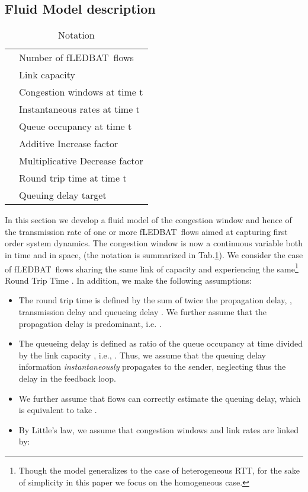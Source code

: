 \documentclass[conference]{IEEEtran}
\newcommand{\fledbat}[0]{fLEDBAT}
\begin{document}
\subsection{Fluid Model description}\label{sec:fluidmodel}
\begin{table}[!t]
   \begin{footnotesize}
   \begin{center}
      \caption{Notation}\label{tab:notation}
      \begin{tabular}{|l|l|}
         \hline
                                & Number of \fledbat\ flows \\
                                & Link capacity \\
           & Congestion windows at time t \\
           & Instantaneous rates at time t \\
                              & Queue occupancy at time t \\
                           & Additive Increase factor \\
                            & Multiplicative Decrease factor \\
                              & Round trip time at time t \\
                             & Queuing delay target \\
         \hline
      \end{tabular}
   \end{center}
   \end{footnotesize}
\end{table}
In this section we develop a fluid model of the congestion window and hence of the transmission rate of one or more \fledbat\ flows aimed at capturing first order system dynamics.
The congestion window is now a continuous variable both in time and in space,   (the notation is summarized in Tab.\ref{tab:notation}).
We consider the case of  \fledbat\ flows sharing the same link of capacity  and experiencing the same\footnote{Though the model generalizes to the case of heterogeneous RTT, for the sake of simplicity in this paper we focus on the homogeneous case.} Round Trip Time .
In addition, we make the following assumptions:
\begin{itemize}
  \item The round trip time  is defined by the sum of twice the propagation delay, , transmission delay  and queueing delay .
  We further assume that the propagation delay is predominant, i.e. .
   \item The queueing delay  is defined as ratio of the queue occupancy  at time  divided by the link capacity , i.e.,   . Thus, we assume that the queuing delay information \emph{instantaneously} propagates to the sender, neglecting thus the delay in the feedback loop.
\item We further assume that flows can correctly estimate the queuing delay, which is equivalent to take .
  \item By Little's law, we assume that congestion windows and link rates are linked by:

\end{itemize}
\end{document}
